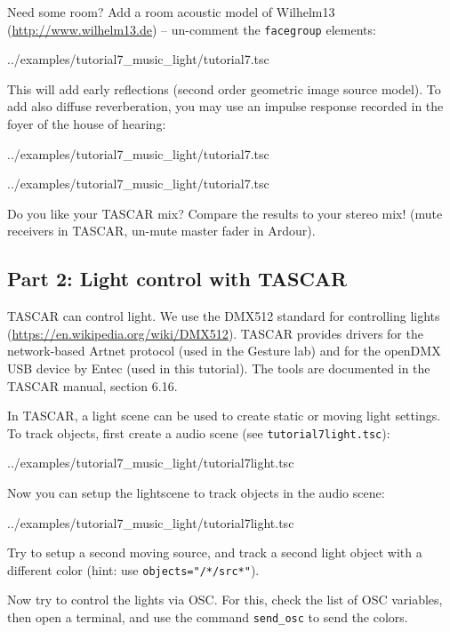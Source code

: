 \documentclass[11pt,a4paper,twoside]{article}
\begin{document}
Need some room? Add a room acoustic model of Wilhelm13
(\url{http://www.wilhelm13.de}) -- un-comment the \verb!facegroup! elements:
\begin{lstinputlisting}[language=tsc,linerange=35-37,firstnumber=35,caption={}]{../examples/tutorial7_music_light/tutorial7.tsc}
\end{lstinputlisting}
This will add early reflections (second order geometric image source
model). To add also diffuse reverberation, you may use an impulse
response recorded in the foyer of the house of hearing:
\begin{lstinputlisting}[language=tsc,linerange=40-40,firstnumber=40,caption={}]{../examples/tutorial7_music_light/tutorial7.tsc}
\end{lstinputlisting}
\begin{lstinputlisting}[language=tsc,linerange=44-55,firstnumber=44,caption={}]{../examples/tutorial7_music_light/tutorial7.tsc}
\end{lstinputlisting}

Do you like your TASCAR mix? Compare the results to your stereo mix! (mute receivers in TASCAR, un-mute master fader in Ardour).

\subsection*{Part 2: Light control with TASCAR}

TASCAR can control light. We use the DMX512 standard for controlling
lights (\url{https://en.wikipedia.org/wiki/DMX512}). TASCAR provides
drivers for the network-based Artnet protocol (used in the Gesture
lab) and for the openDMX USB device by Entec (used in this
tutorial). The tools are documented in the TASCAR manual, section
6.16.

In TASCAR, a light scene can be used to create static or moving light
settings. To track objects, first create a audio scene (see \verb!tutorial7light.tsc!):
\begin{lstinputlisting}[language=tsc,linerange=4-16,firstnumber=4,caption={}]{../examples/tutorial7_music_light/tutorial7light.tsc}
\end{lstinputlisting}
Now you can setup the lightscene to track objects in the audio scene:
\begin{lstinputlisting}[language=tsc,linerange=19-19,firstnumber=19,caption={}]{../examples/tutorial7_music_light/tutorial7light.tsc}
\end{lstinputlisting}
Try to setup a second moving source, and track a second light object
with a different color (hint: use \verb!objects="/*/src*"!).

Now try to control the lights via OSC. For this, check the list of OSC
variables, then open a terminal, and use the command \verb!send_osc!
to send the colors.
\fi
\end{document}
